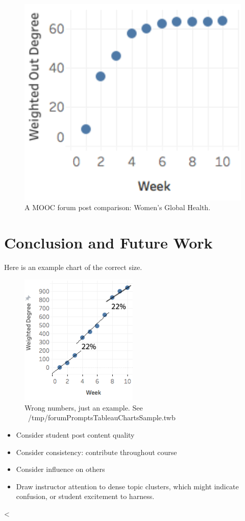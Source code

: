 \begin{figure}[htp]
       \centering
       \includegraphics[width=1\textwidth]{Figs/women_health_summer2015_top10.png}
       \caption{\textnormal{A MOOC forum post comparison: Women's
           Global Health.}}
       \label{fig:womenHealth}
\end{figure}


\section{Conclusion and Future Work}

Here is an example chart of the correct size.
\begin{figure}[htp]
       \centering
       \includegraphics[width=0.5\textwidth]{Figs/exampleChart1.png}
       \caption{\textnormal{Wrong numbers, just an example. See ~/tmp/forumPromptsTableauChartsSample.twb}}
       \label{fig:exampleChart}
\end{figure}


\begin{itemize}
\item Consider student post content quality
\item Consider consistency: contribute throughout course
\item Consider influence on others
\item Draw instructor attention to dense topic clusters, which might
  indicate confusion, or student excitement to harness.
\end{itemize}
<
